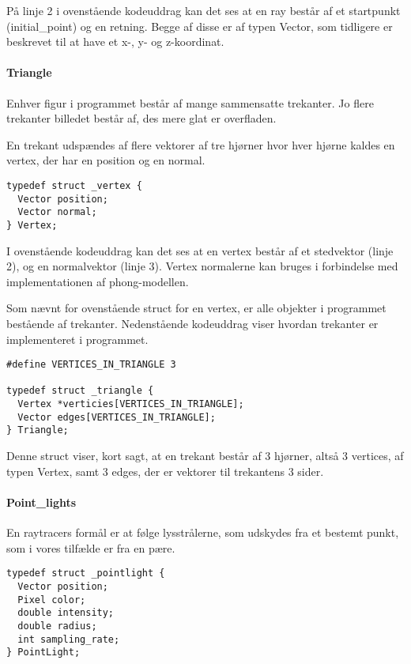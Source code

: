 På linje 2 i ovenstående kodeuddrag kan det ses at en ray består af et startpunkt (initial\_point) og en retning. Begge af disse er af typen Vector, som tidligere er beskrevet til at have et x-, y- og z-koordinat.

\paragraph{Triangle}
Enhver figur i programmet består af mange sammensatte trekanter. Jo flere trekanter billedet består af, des mere glat er overfladen.

En trekant udspændes af flere vektorer af tre hjørner hvor hver hjørne kaldes en vertex, der har en position og en normal.
    
\begin{lstlisting}[style=Cstyle, caption=Struct til vertex]
typedef struct _vertex {
  Vector position;
  Vector normal;
} Vertex;
\end{lstlisting}

I ovenstående kodeuddrag kan det ses at en vertex består af et stedvektor (linje 2), og en normalvektor (linje 3). Vertex normalerne kan bruges i forbindelse med implementationen af phong-modellen.

Som nævnt for ovenstående struct for en vertex, er alle objekter i programmet bestående af trekanter. Nedenstående kodeuddrag viser hvordan trekanter er implementeret i programmet.
    
\begin{lstlisting}[style=Cstyle, caption=Struct til triangle]
#define VERTICES_IN_TRIANGLE 3

typedef struct _triangle {
  Vertex *verticies[VERTICES_IN_TRIANGLE];
  Vector edges[VERTICES_IN_TRIANGLE];
} Triangle;
\end{lstlisting}

Denne struct viser, kort sagt, at en trekant består af 3 hjørner, altså 3 vertices, af typen Vertex, samt 3 edges, der er vektorer til trekantens 3 sider. 

\paragraph{Point\_lights}

En raytracers formål er at følge lysstrålerne, som udskydes fra et bestemt punkt, som i vores tilfælde er fra en pære. 

\begin{lstlisting}[style=Cstyle, caption=Struct til light]
typedef struct _pointlight {
  Vector position;
  Pixel color;
  double intensity;
  double radius;
  int sampling_rate;
} PointLight;
\end{lstlisting}

